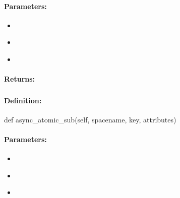 \paragraph{Parameters:}
\begin{itemize}[noitemsep]
\item {}\\

\item {}\\

\item {}\\

\end{itemize}

\paragraph{Returns:}


\pagebreak
\subsubsection{}
\label{api:python:async_atomic_sub}


\paragraph{Definition:}
\begin{pythoncode}
def async_atomic_sub(self, spacename, key, attributes)
\end{pythoncode}

\paragraph{Parameters:}
\begin{itemize}[noitemsep]
\item {}\\

\item {}\\

\item {}\\

\end{itemize}

